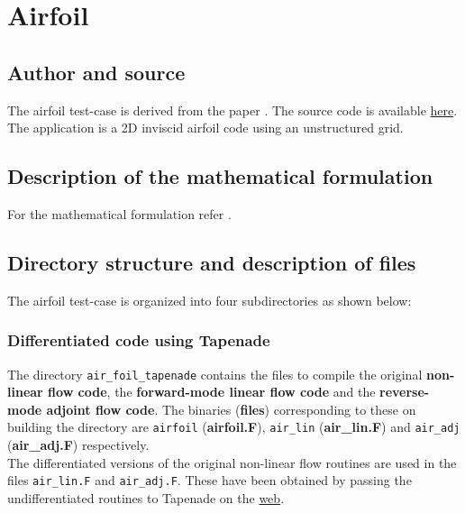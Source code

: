 \section{Airfoil}
\subsection{Author and source}
The airfoil test-case is derived from the paper \cite{Giles_2005}. The source code is available \href{http://people.maths.ox.ac.uk/gilesm/codes/airfoil/bangalore05.tar}{here}. The application is a 2D inviscid airfoil code using an unstructured grid. 
\subsection{Description of the mathematical formulation}
For the mathematical formulation refer \cite{Giles_2005}.

\subsection{Directory structure and description of files}
The airfoil test-case is organized into four subdirectories as shown below:\\
\subsubsection{Differentiated code using Tapenade}
The directory \texttt{air\_foil\_tapenade} contains the files to compile the original \textbf{non-linear flow code}, the \textbf{forward-mode linear flow code} and the \textbf{reverse-mode adjoint flow code}. The binaries (\textbf{files}) corresponding to these on building the directory are \texttt{airfoil} (\textbf{{airfoil.F}}), \texttt{air\_lin} (\textbf{{air\_lin.F}}) and \texttt{air\_adj} (\textbf{{air\_adj.F}}) respectively. \\

\noindent The differentiated versions of the original non-linear flow routines are used in the files \texttt{air\_lin.F} and \texttt{air\_adj.F}. These have been obtained by passing the undifferentiated routines to Tapenade on the \href{http://www-tapenade.inria.fr:8080/tapenade/index.jsp}{web}. \\

